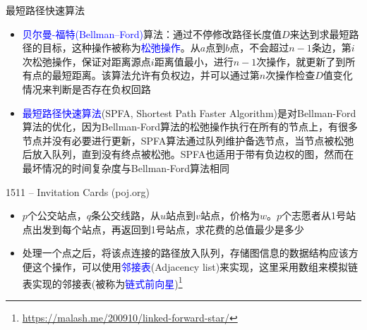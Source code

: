 \begin{frame}{最短路径快速算法}
    \begin{itemize}
        \item \textcolor{blue}{贝尔曼-福特(Bellman–Ford)}算法：通过不停修改路径长度值$D$来达到求最短路径的目标，这种操作被称为\textcolor{blue}{松弛操作}。从$a$点到$b$点，不会超过$n-1$条边，第$i$次松弛操作，保证对距离源点$i$距离值最小，进行$n-1$次操作，就更新了到所有点的最短距离。该算法允许有负权边，并可以通过第$n$次操作检查$D$值变化情况来判断是否存在负权回路
        \vfill
        \item \textcolor{blue}{最短路径快速算法}(SPFA, Shortest Path Faster Algorithm)是对Bellman-Ford算法的优化，因为Bellman-Ford算法的松弛操作执行在所有的节点上，有很多节点并没有必要进行更新，SPFA算法通过队列维护备选节点，当节点被松弛后放入队列，直到没有终点被松弛。SPFA也适用于带有负边权的图，然而在最坏情况的时间复杂度与Bellman-Ford算法相同
\end{itemize}
\end{frame}
\begin{frame}{1511 -- Invitation Cards (poj.org)}
    \begin{itemize}
        \item $p$个公交站点，$q$条公交线路，从$u$站点到$v$站点，价格为$w$。$p$个志愿者从1号站点出发到每个站点，再返回到1号站点，求花费的总值最少是多少
        \vfill
        \item 处理一个点之后，将该点连接的路径放入队列，存储图信息的数据结构应该方便这个操作，可以使用\textcolor{blue}{邻接表}(Adjacency list)来实现，这里采用数组来模拟链表实现的邻接表(被称为\textcolor{blue}{链式前向星})\footnote{\url{https://malash.me/200910/linked-forward-star/}}
\end{itemize}
\end{frame}

